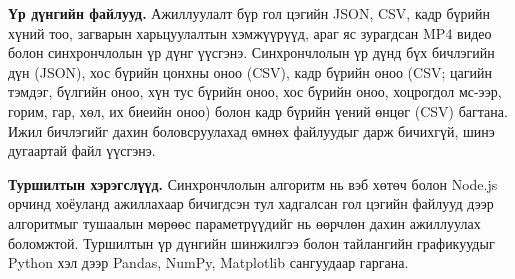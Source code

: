 \textbf{Үр дүнгийн файлууд.} Ажиллуулалт бүр гол цэгийн JSON, CSV, кадр бүрийн хүний тоо, загварын харьцуулалтын хэмжүүрүүд, араг яс зурагдсан MP4 видео болон синхрончлолын үр дүнг үүсгэнэ. Синхрончлолын үр дүнд бүх бичлэгийн дүн (JSON), хос бүрийн цонхны оноо (CSV), кадр бүрийн оноо (CSV; цагийн тэмдэг, бүлгийн оноо, хүн тус бүрийн оноо, хос бүрийн оноо, хоцрогдол мс-ээр, горим, гар, хөл, их биеийн оноо) болон кадр бүрийн үений өнцөг (CSV) багтана. Ижил бичлэгийг дахин боловсруулахад өмнөх файлуудыг дарж бичихгүй, шинэ дугаартай файл үүсгэнэ.

\textbf{Туршилтын хэрэгслүүд.} Синхрончлолын алгоритм нь вэб хөтөч болон Node.js орчинд хоёуланд ажиллахаар бичигдсэн тул хадгалсан гол цэгийн файлууд дээр алгоритмыг тушаалын мөрөөс параметрүүдийг нь өөрчлөн дахин ажиллуулах боломжтой. Туршилтын үр дүнгийн шинжилгээ болон тайлангийн графикуудыг Python хэл дээр Pandas, NumPy, Matplotlib сангуудаар гаргана.
